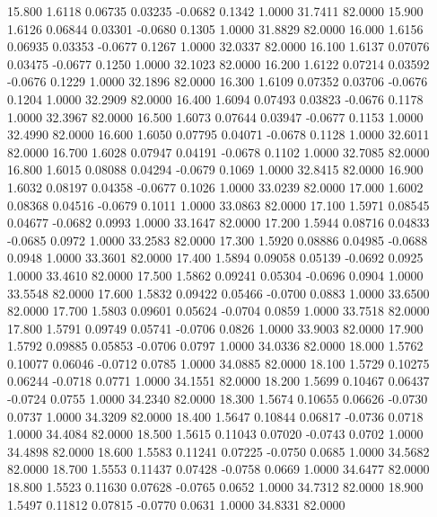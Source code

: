   15.800   1.6118   0.06735   0.03235  -0.0682   0.1342   1.0000  31.7411  82.0000
  15.900   1.6126   0.06844   0.03301  -0.0680   0.1305   1.0000  31.8829  82.0000
  16.000   1.6156   0.06935   0.03353  -0.0677   0.1267   1.0000  32.0337  82.0000
  16.100   1.6137   0.07076   0.03475  -0.0677   0.1250   1.0000  32.1023  82.0000
  16.200   1.6122   0.07214   0.03592  -0.0676   0.1229   1.0000  32.1896  82.0000
  16.300   1.6109   0.07352   0.03706  -0.0676   0.1204   1.0000  32.2909  82.0000
  16.400   1.6094   0.07493   0.03823  -0.0676   0.1178   1.0000  32.3967  82.0000
  16.500   1.6073   0.07644   0.03947  -0.0677   0.1153   1.0000  32.4990  82.0000
  16.600   1.6050   0.07795   0.04071  -0.0678   0.1128   1.0000  32.6011  82.0000
  16.700   1.6028   0.07947   0.04191  -0.0678   0.1102   1.0000  32.7085  82.0000
  16.800   1.6015   0.08088   0.04294  -0.0679   0.1069   1.0000  32.8415  82.0000
  16.900   1.6032   0.08197   0.04358  -0.0677   0.1026   1.0000  33.0239  82.0000
  17.000   1.6002   0.08368   0.04516  -0.0679   0.1011   1.0000  33.0863  82.0000
  17.100   1.5971   0.08545   0.04677  -0.0682   0.0993   1.0000  33.1647  82.0000
  17.200   1.5944   0.08716   0.04833  -0.0685   0.0972   1.0000  33.2583  82.0000
  17.300   1.5920   0.08886   0.04985  -0.0688   0.0948   1.0000  33.3601  82.0000
  17.400   1.5894   0.09058   0.05139  -0.0692   0.0925   1.0000  33.4610  82.0000
  17.500   1.5862   0.09241   0.05304  -0.0696   0.0904   1.0000  33.5548  82.0000
  17.600   1.5832   0.09422   0.05466  -0.0700   0.0883   1.0000  33.6500  82.0000
  17.700   1.5803   0.09601   0.05624  -0.0704   0.0859   1.0000  33.7518  82.0000
  17.800   1.5791   0.09749   0.05741  -0.0706   0.0826   1.0000  33.9003  82.0000
  17.900   1.5792   0.09885   0.05853  -0.0706   0.0797   1.0000  34.0336  82.0000
  18.000   1.5762   0.10077   0.06046  -0.0712   0.0785   1.0000  34.0885  82.0000
  18.100   1.5729   0.10275   0.06244  -0.0718   0.0771   1.0000  34.1551  82.0000
  18.200   1.5699   0.10467   0.06437  -0.0724   0.0755   1.0000  34.2340  82.0000
  18.300   1.5674   0.10655   0.06626  -0.0730   0.0737   1.0000  34.3209  82.0000
  18.400   1.5647   0.10844   0.06817  -0.0736   0.0718   1.0000  34.4084  82.0000
  18.500   1.5615   0.11043   0.07020  -0.0743   0.0702   1.0000  34.4898  82.0000
  18.600   1.5583   0.11241   0.07225  -0.0750   0.0685   1.0000  34.5682  82.0000
  18.700   1.5553   0.11437   0.07428  -0.0758   0.0669   1.0000  34.6477  82.0000
  18.800   1.5523   0.11630   0.07628  -0.0765   0.0652   1.0000  34.7312  82.0000
  18.900   1.5497   0.11812   0.07815  -0.0770   0.0631   1.0000  34.8331  82.0000
